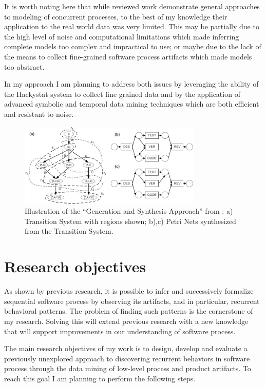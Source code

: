 \documentclass{sig-alternate}
\begin{document}
It is worth noting here that while reviewed work demonstrate general approaches to modeling of concurrent processes, to the best of my knowledge their application to the real world data was very limited. This may be partially due to the high level of noise and computational limitations which made inferring complete models too complex and impractical to use; or maybe due to the lack of the means to collect fine-grained software process artifacts which made models too abstract.

In my approach I am planning to address both issues by leveraging the ability of the Hackystat system \cite{citeulike:4041809} to collect fine grained data and by the application of advanced symbolic and temporal data mining techniques which are both efficient and resistant to noise.

\begin{figure}[htpb]
   \centering
   \includegraphics[height=40mm]{petri.eps}
   \caption{Illustration of the ``Generation and Synthesis Approach'' from \cite{citeulike:5043673}: a) Transition System with regions shown; b),c) Petri Nets synthesized from the Transition System.}
   \label{fig:petri}
\end{figure}

\section{Research objectives}
As shown by previous research, it is possible to infer and successively formalize sequential software process by observing its artifacts, and in particular, recurrent behavioral patterns. The problem of finding such patterns is the cornerstone of my research. Solving this will extend previous research with a new knowledge that will support improvements in our understanding of software process.

The main research objectives of my work is to design, develop and evaluate a previously unexplored approach to discovering recurrent behaviors in software process through the data mining of low-level process and product artifacts. To reach this goal I am planning to perform the following steps. 
\end{document}
